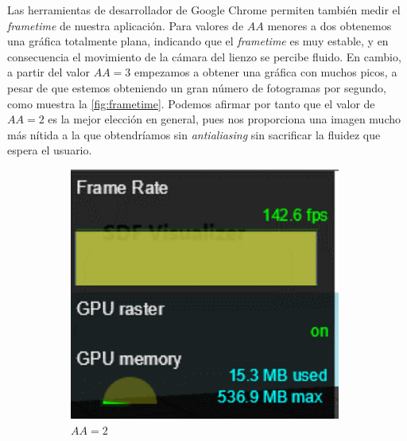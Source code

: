 Las herramientas de desarrollador de Google Chrome permiten también medir el \textit{frametime} de nuestra aplicación. Para valores de $AA$ menores a dos obtenemos una gráfica totalmente plana, indicando que el \textit{frametime} es muy estable, y en consecuencia el movimiento de la cámara del lienzo se percibe fluido. En cambio, a partir del valor $AA=3$ empezamos a obtener una gráfica con muchos picos, a pesar de que estemos obteniendo un gran número de fotogramas por segundo, como muestra la \autoref{fig:frametime}. Podemos afirmar por tanto que el valor de $AA=2$ es la mejor elección en general, pues nos proporciona una imagen mucho más nítida a la que obtendríamos sin \textit{antialiasing} sin sacrificar la fluidez que espera el usuario.\newline
\begin{figure}[!h]
     \begin{subfigure}[c]{0.4\linewidth}
        \centering
        \includegraphics[width=0.98\textwidth]{Plantilla-TFG-master/img/graficas/frametimeG.png}
        \caption{$AA=2$}
     \end{subfigure}
     \hfill
     \begin{subfigure}[c]{0.4\linewidth}
        \centering

\end{subfigure}
\end{figure}
